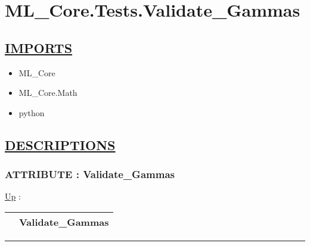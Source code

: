 \chapter*{ML\_Core.Tests.Validate\_Gammas}
\hypertarget{ecldoc:toc:ML_Core.Tests.Validate_Gammas}{}

\section*{\underline{IMPORTS}}
\begin{itemize}
\item ML\_Core
\item ML\_Core.Math
\item python
\end{itemize}

\section*{\underline{DESCRIPTIONS}}
\subsection*{ATTRIBUTE : Validate\_Gammas}
\hypertarget{ecldoc:ml_core.tests.validate_gammas}{}
\hyperlink{ecldoc:toc:ML_Core/Tests}{Up} :

{\renewcommand{\arraystretch}{1.5}
\begin{tabularx}{\textwidth}{|>{\raggedright\arraybackslash}l|X|}
\hline
\hspace{0pt} & Validate\_Gammas \\
\hline
\end{tabularx}
}

\par


\rule{\linewidth}{0.5pt}
